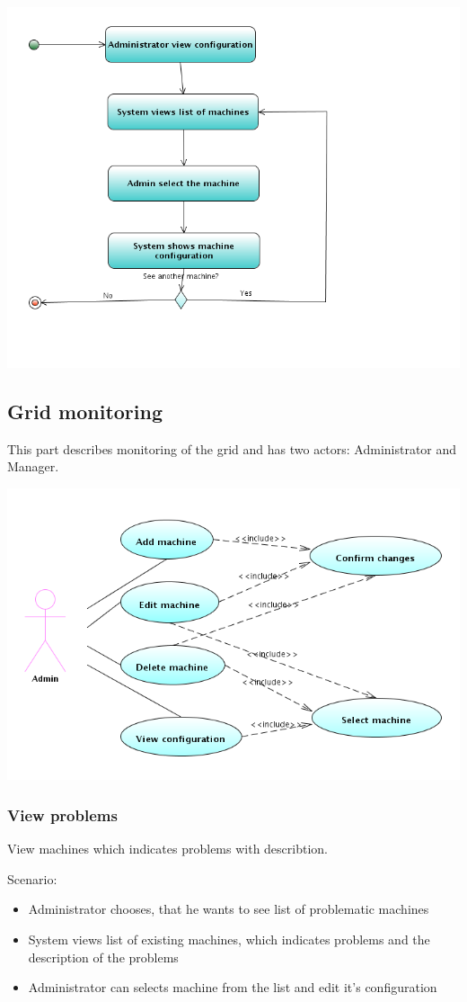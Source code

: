 \documentclass{article}
\begin{document}
\includegraphics[width=\linewidth]{ViewConf.png}


\subsection{Grid monitoring}
This part describes monitoring of the grid and has two actors: Administrator and Manager.

\includegraphics[width=\linewidth]{grid_managing.png}

\subsubsection{View problems}
View machines which indicates problems with describtion.

Scenario:
\begin{itemize}
\item{Administrator chooses, that he wants to see list of problematic machines}
\item{System views list of existing machines, which indicates problems and the description of the problems}
\item{Administrator can selects machine from the list and edit it's configuration}
\end{itemize}
\end{document}
